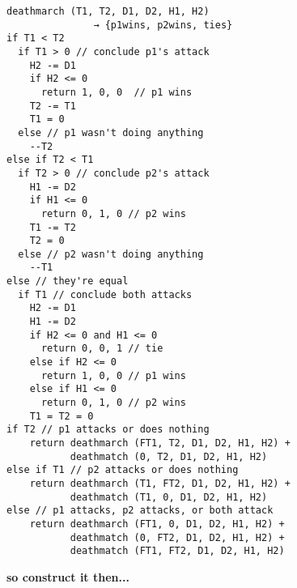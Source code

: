 \begin{lstlisting}[caption={Death march simulation pseudocode},label={list:deathmarch}]
deathmarch (T1, T2, D1, D2, H1, H2)
               → {p1wins, p2wins, ties}
if T1 < T2
  if T1 > 0 // conclude p1's attack
    H2 -= D1
    if H2 <= 0
      return 1, 0, 0  // p1 wins
    T2 -= T1
    T1 = 0
  else // p1 wasn't doing anything
    --T2
else if T2 < T1
  if T2 > 0 // conclude p2's attack
    H1 -= D2
    if H1 <= 0
      return 0, 1, 0 // p2 wins
    T1 -= T2
    T2 = 0
  else // p2 wasn't doing anything
    --T1
else // they're equal
  if T1 // conclude both attacks
    H2 -= D1
    H1 -= D2
    if H2 <= 0 and H1 <= 0
      return 0, 0, 1 // tie
    else if H2 <= 0
      return 1, 0, 0 // p1 wins
    else if H1 <= 0
      return 0, 1, 0 // p2 wins
    T1 = T2 = 0
if T2 // p1 attacks or does nothing
    return deathmarch (FT1, T2, D1, D2, H1, H2) +
           deathmatch (0, T2, D1, D2, H1, H2)
else if T1 // p2 attacks or does nothing
    return deathmarch (T1, FT2, D1, D2, H1, H2) +
           deathmatch (T1, 0, D1, D2, H1, H2)
else // p1 attacks, p2 attacks, or both attack
    return deathmarch (FT1, 0, D1, D2, H1, H2) +
           deathmatch (0, FT2, D1, D2, H1, H2) +
           deathmatch (FT1, FT2, D1, D2, H1, H2)
\end{lstlisting}

\textbf{so construct it then...}
